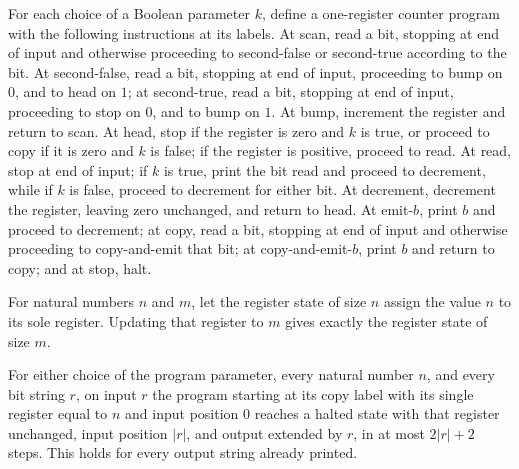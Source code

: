 \begin{definition}
\label{Complexity.PrefixByLength.program}
\leanok
{}
For each choice of a Boolean parameter $k$, define a one-register counter program with
the following instructions at its labels. At scan, read a bit, stopping at end of input
and otherwise proceeding to second-false or second-true according to the bit. At
second-false, read a bit, stopping at end of input, proceeding to bump on $0$, and to
head on $1$; at second-true, read a bit, stopping at end of input, proceeding to stop on
$0$, and to bump on $1$. At bump, increment the register and return to scan. At head,
stop if the register is zero and $k$ is true, or proceed to copy if it is zero and $k$
is false; if the register is positive, proceed to read. At read, stop at end of input;
if $k$ is true, print the bit read and proceed to decrement, while if $k$ is false,
proceed to decrement for either bit. At decrement, decrement the register, leaving zero
unchanged, and return to head. At emit-$b$, print $b$ and proceed to decrement; at copy,
read a bit, stopping at end of input and otherwise proceeding to copy-and-emit that bit;
at copy-and-emit-$b$, print $b$ and return to copy; and at stop, halt.
\end{definition}

\begin{theorem}
\label{Complexity.PrefixByLength.update_regs}
\leanok
{}
For natural numbers $n$ and $m$, let the register state of size $n$ assign the value $n$
to its sole register. Updating that register to $m$ gives exactly the register state of
size $m$.
\end{theorem}

\begin{theorem}
\label{Complexity.PrefixByLength.goes_copy}
\leanok
{}
For either choice of the program parameter, every natural number $n$, and every bit
string $r$, on input $r$ the program starting at its copy label with its single register
equal to $n$ and input position $0$ reaches a halted state with that register unchanged,
input position $|r|$, and output extended by $r$, in at most $2|r|+2$ steps. This holds
for every output string already printed.
\end{theorem}

